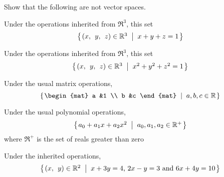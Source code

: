 
\begin{Exercise}[
name={},
title={}, 
difficulty=0,
origin={\cite{JH}}]
Show that the following are not vector spaces.

\Question Under the operations inherited from \( \Re^3 \), this set
        \begin{equation*}
          \set{\rowvec{x, &y, &z}\in\Re^3\suchthat x+y+z=1}
        \end{equation*}

\Question Under the operations inherited from \( \Re^3 \), this set
        \begin{equation*}
          \set{\rowvec{x, &y, &z}\in\Re^3\suchthat x^2+y^2+z^2=1}
        \end{equation*}

\Question Under the usual matrix operations,
        \begin{equation*}
          \set{\begin{mat}
                 a  &1  \\
                 b  &c
               \end{mat} \suchthat a,b,c\in\Re}
        \end{equation*}

\Question Under the usual polynomial operations,
        \begin{equation*}
          \mbox{$\left\{\hspace{0.1em}a_0+a_1x+a_2x^2\;\;\middle|\;\; a_0,a_1,a_2\in\mathbb{R}^+\hspace{0.1em}\right\}$}
        \end{equation*}
        where $\Re^+$ is the set of reals greater than zero

\Question Under the inherited operations,
        \begin{equation*}
          \set{\rowvec{x, &y}\in\Re^2\suchthat
               \text{\( x+3y=4 \), \( 2x-y=3 \) and \( 6x+4y=10 \)} }
        \end{equation*}


\end{Exercise}

